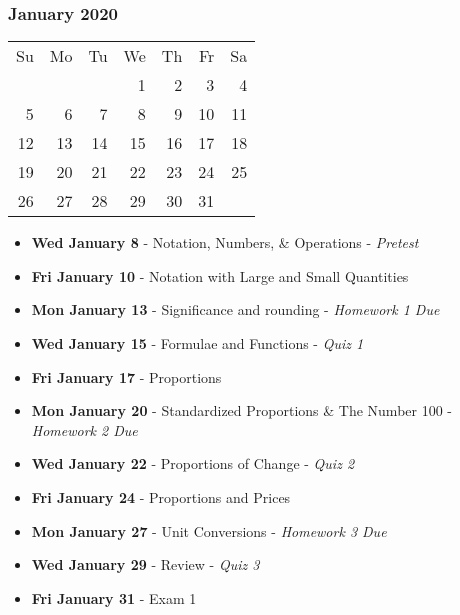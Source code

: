 \subsubsection*{January 2020}
\begin{tabular}{rrrrrrr}
Su & Mo & Tu & We & Th & Fr & Sa\\
   &    &    &  1 &  2 &  3 &  4\\ 
 5 &  6 &  7 &  8 &  9 & 10 & 11\\ 
12 & 13 & 14 & 15 & 16 & 17 & 18\\ 
19 & 20 & 21 & 22 & 23 & 24 & 25\\ \cline{6-6}
26 & 27 & 28 & 29 & 30 & \multicolumn{1}{|r|}{31} &\\ \cline{6-6}
\end{tabular}

\begin{itemize}
\item\textbf{Wed January  8}
  - Notation, Numbers, \& Operations - {\em Pretest}
\item\textbf{Fri January 10}
  - Notation with Large and Small Quantities
\item\textbf{Mon January 13}
  - Significance and rounding - {\em Homework 1 Due}
\item\textbf{Wed January 15}
  - Formulae and Functions - {\em Quiz 1}
\item\textbf{Fri January 17}
  - Proportions
\item\textbf{Mon January 20} 
  - Standardized Proportions \& The Number 100 - {\em Homework 2 Due}
\item\textbf{Wed January 22}
  - Proportions of Change - {\em Quiz 2}
\item\textbf{Fri January 24}
  - Proportions and Prices  
\item\textbf{Mon January 27}
  - Unit Conversions - {\em Homework 3 Due}
\item\textbf{Wed January 29}
  - Review - {\em Quiz 3}
\item\textbf{Fri January 31}
  - Exam 1
\end{itemize}
\hrulefill

